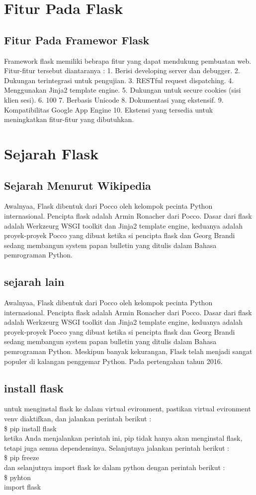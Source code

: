 \documentclass[12pt,a4paper]{article}
\begin{document}
\section{Fitur Pada Flask}
\subsection{Fitur Pada Framewor Flask}
Framework flask memiliki bebrapa fitur yang dapat mendukung pembuatan web. Fitur-fitur tersebut diantaranya : 
1.	Berisi developing server dan debugger.
2.	Dukungan terintegrasi untuk pengujian.
3.	RESTful request dispatching.
4.	Menggunakan Jinja2 template engine.
5.	Dukungan untuk secure cookies (sisi klien sesi).
6.	100%
7.	Berbasis Unicode
8.	Dokumentasi yang ekstensif.
9.	Kompatibilitas Google App Engine
10.	Ekstensi yang tersedia untuk meningkatkan fitur-fitur yang dibutuhkan.

\section{Sejarah Flask}
\subsection{Sejarah Menurut Wikipedia}
Awalnyaa, Flask dibentuk dari Pocco oleh kelompok pecinta Python internasional. Pencipta flask adalah Armin Ronacher dari Pocco. Dasar dari flask adalah Werkzeurg WSGI toolkit dan Jinja2 template engine, keduanya adalah proyek-proyek Pocco yang dibuat ketika si pencipta flask dan Georg Brandi sedang membangun system papan bulletin yang ditulis dalam Bahasa pemrograman Python.

\subsection{sejarah lain}
Awalnyaa, Flask dibentuk dari Pocco oleh kelompok pecinta Python internasional. Pencipta flask adalah Armin Ronacher dari Pocco. Dasar dari flask adalah Werkzeurg WSGI toolkit dan Jinja2 template engine, keduanya adalah proyek-proyek Pocco yang dibuat ketika si pencipta flask dan Georg Brandi sedang membangun system papan bulletin yang ditulis dalam Bahasa pemrograman Python. Meskipun banyak kekurangan, Flask telah menjadi sangat populer di kalangan penggemar Python. Pada pertengahan tahun 2016. 
\subsection{install flask}
untuk menginstal flask ke dalam virtual evironment, pastikan virtual evironment venv diaktifkan, dan jalankan perintah berikut :\\
\$ pip install flask\\
ketika Anda menjalankan perintah ini, pip tidak hanya akan menginstal flask, tetapi juga semua dependensinya. Selanjutnya jalankan perintah berikut :\\
\$ pip freeze\\
dan selanjutnya import flask ke dalam python dengan perintah berikut :\\
\$ pyhton\\
import flask
\end{document}

